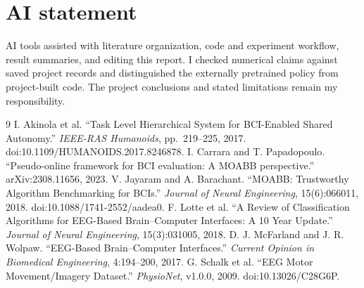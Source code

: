 \documentclass[11pt]{article}
\begin{document}
\section{AI statement}
AI tools assisted with literature organization, code and experiment workflow, result summaries, and editing this report. I checked numerical claims against saved project records and distinguished the externally pretrained policy from project-built code. The project conclusions and stated limitations remain my responsibility.

\begin{thebibliography}{9}\small
{} I. Akinola et al. ``Task Level Hierarchical System for BCI-Enabled Shared Autonomy.'' \emph{IEEE-RAS Humanoids}, pp.~219--225, 2017. doi:10.1109/HUMANOIDS.2017.8246878.
 I. Carrara and T. Papadopoulo. ``Pseudo-online framework for BCI evaluation: A MOABB perspective.'' arXiv:2308.11656, 2023.
 V. Jayaram and A. Barachant. ``MOABB: Trustworthy Algorithm Benchmarking for BCIs.'' \emph{Journal of Neural Engineering}, 15(6):066011, 2018. doi:10.1088/1741-2552/aadea0.
 F. Lotte et al. ``A Review of Classification Algorithms for EEG-Based Brain--Computer Interfaces: A 10 Year Update.'' \emph{Journal of Neural Engineering}, 15(3):031005, 2018.
 D. J. McFarland and J. R. Wolpaw. ``EEG-Based Brain--Computer Interfaces.'' \emph{Current Opinion in Biomedical Engineering}, 4:194--200, 2017.
 G. Schalk et al. ``EEG Motor Movement/Imagery Dataset.'' \emph{PhysioNet}, v1.0.0, 2009. doi:10.13026/C28G6P.
\end{thebibliography}
\end{document}
